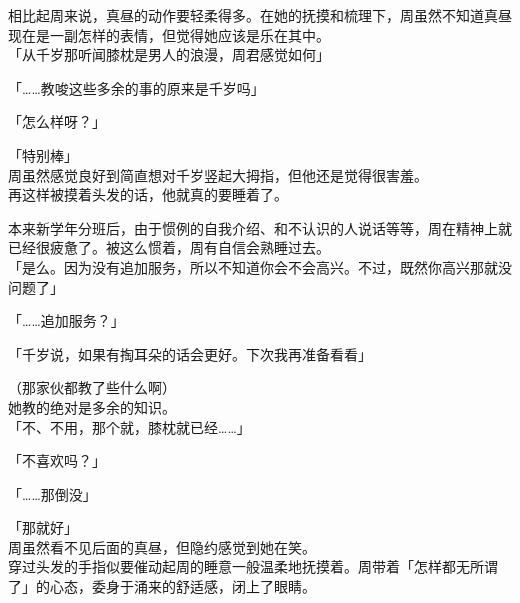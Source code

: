 相比起周来说，真昼的动作要轻柔得多。在她的抚摸和梳理下，周虽然不知道真昼现在是一副怎样的表情，但觉得她应该是乐在其中。\\

「从千岁那听闻膝枕是男人的浪漫，周君感觉如何」

「……教唆这些多余的事的原来是千岁吗」

「怎么样呀？」

「特别棒」\\

周虽然感觉良好到简直想对千岁竖起大拇指，但他还是觉得很害羞。\\%

再这样被摸着头发的话，他就真的要睡着了。

本来新学年分班后，由于惯例的自我介绍、和不认识的人说话等等，周在精神上就已经很疲惫了。被这么惯着，周有自信会熟睡过去。\\

「是么。因为没有追加服务，所以不知道你会不会高兴。不过，既然你高兴那就没问题了」

「……追加服务？」

「千岁说，如果有掏耳朵的话会更好。下次我再准备看看」

（那家伙都教了些什么啊）\\

她教的绝对是多余的知识。\\

「不、不用，那个就，膝枕就已经……」

「不喜欢吗？」

「……那倒没」

「那就好」\\

周虽然看不见后面的真昼，但隐约感觉到她在笑。\\

穿过头发的手指似要催动起周的睡意一般温柔地抚摸着。周带着「怎样都无所谓了」的心态，委身于涌来的舒适感，闭上了眼睛。
